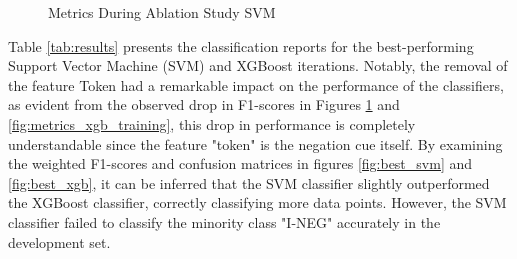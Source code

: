 \begin{figure}[!ht]
\centering
  \caption{Metrics During Ablation Study SVM}
  \label{fig:metrics_svm_training}
\end{figure}

Table \ref{tab:results} presents the classification reports for the best-performing Support Vector Machine (SVM) and XGBoost iterations. Notably, the removal of the feature Token had a remarkable impact on the performance of the classifiers, as evident from the observed drop in F1-scores in Figures \ref{fig:metrics_svm_training} and \ref{fig:metrics_xgb_training}, this drop in performance is completely understandable since the feature "token" is the negation cue itself. By examining the weighted F1-scores and confusion matrices in figures \ref{fig:best_svm} and \ref{fig:best_xgb}, it can be inferred that the SVM classifier slightly outperformed the XGBoost classifier, correctly classifying more data points. However, the SVM classifier failed to classify the minority class "I-NEG" accurately in the development set.

